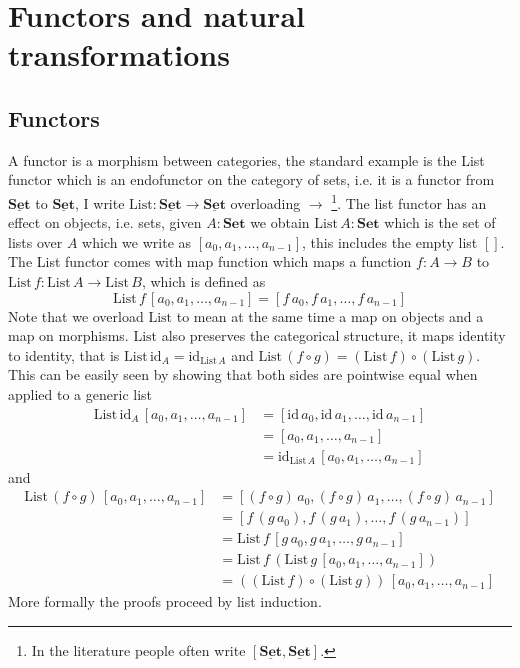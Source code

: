 \documentclass{article}
\newcommand{\Set}{\mathbf{Set}}
\newcommand{\cat}[1]{\underline{\mathbf{#1}}}
\newcommand{\cSet}{\cat{\Set}}
\newcommand{\id}{\mathrm{id}}
\newcommand{\List}{\mathrm{List}}
\begin{document}
\newpage
\section{Functors and natural transformations}
\label{sec:funct-natur-transf}

\subsection{Functors}
\label{sec:functors}

A functor is a morphism between categories, the standard example is the List functor which is an endofunctor on the category of sets, i.e. it is a functor from $\cSet$ to $\cSet$, I write $\List : \cSet \to \cSet$ overloading $\to$%
\footnote{In the literature people often write $[\cSet,\cSet].$}.
The list functor has an effect on objects, i.e. sets, given $A : \Set$ we obtain $\List\,A : \Set$ which is the set of lists over $A$ which we write as $[a_0,a_1,\dots,a_{n-1}]$, this includes the empty list $[]$.
The List functor comes with map function which maps a function $f : A \to B$ to $\List\,f : \List\,A \to \List\,B$, which is defined as 
\[ \List\,f\, [a_0,a_1,\dots,a_{n-1}] = [f\,a_0,f\,a_1,\dots,f\,a_{n-1}]\]
Note that we overload $\List$ to mean at the same time a map on objects and a map on morphisms. $\List$ also preserves the categorical structure, it maps identity to identity, that is $\List\,\id_A = \id_{\List\,A}$ and 
$\List\,(f\circ g) = (\List\,f) \circ (\List\,g)$. This can be easily seen by showing that both sides are pointwise equal when applied to a generic list
\begin{align*}
\List\,\id_A\, [a_0,a_1,\dots,a_{n-1}] & =  [\id\,a_0,\id\,a_1,\dots,\id\,a_{n-1}] \\
& =  [a_0,a_1,\dots,a_{n-1}] \\
& = \id_{\List\,A}\,  [a_0,a_1,\dots,a_{n-1}]
\end{align*}
and
\begin{align*}
\List\,(f \circ g)\, [a_0,a_1,\dots,a_{n-1}] & =  [(f \circ g)\,a_0,(f\circ g)\,a_1,\dots,(f\circ g)\,a_{n-1}] \\
& =  [f\,(g\,a_0),f\,(g\,a_1),\dots,f \,(g\, a_{n-1})] \\
& = \List\,f\, [g\,a_0,g\,a_1,\dots,g\, a_{n-1}]\\
& = \List\,f\,(\List\,g\, [a_0,a_1,\dots,a_{n-1}])\\
& = ((\List\,f) \circ (\List\,g))\, [a_0,a_1,\dots,a_{n-1}]
\end{align*}
More formally the proofs proceed by list induction.
\end{document}
